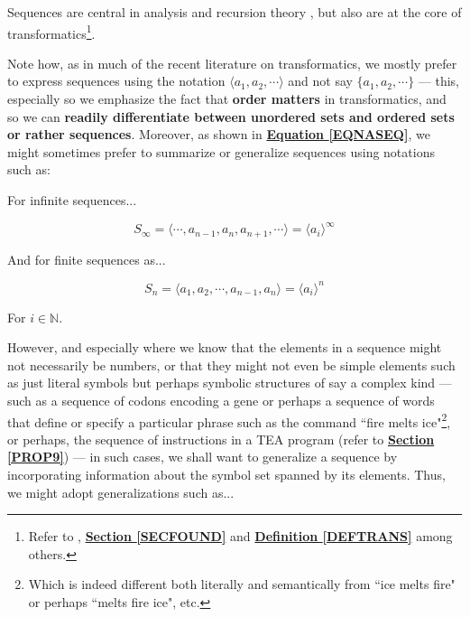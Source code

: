 \documentclass[a4paper, 18pt]{book} %
\begin{document}
\begin{appendices}
 Sequences are central in analysis and recursion theory \cite{rudin1976principles}, but also are at the core of transformatics\footnote{Refer to \cite{Lutalo2025_transformatics_thesis}, \textbf{\hyperref[SECFOUND]{Section \ref{SECFOUND}}} and \textbf{\hyperref[DEFTRANS]{Definition \ref{DEFTRANS}}} among others.}.

\vspace{2em}

Note how, as in much of the recent literature on transformatics, we mostly prefer to express sequences using the notation $\langle a_1, a_2, \cdots \rangle$ and not say $\{ a_1, a_2, \cdots \}$ --- this, especially so we emphasize the fact that \textbf{order matters} in transformatics, and so we can \textbf{readily differentiate between unordered sets and ordered sets or rather sequences}. Moreover, as shown in \textbf{\hyperref[EQNASEQ]{Equation \ref{EQNASEQ}}}, we might sometimes prefer to summarize or generalize sequences using notations such as:

\vspace{2em}
For infinite sequences...

\begin{equation}
S_\infty = \langle \cdots, a_{n-1}, a_n, a_{n+1}, \cdots \rangle = \langle a_i \rangle^\infty
\end{equation} 

\vspace{2em}
And for finite sequences as...

\begin{equation}
S_n = \langle a_1, a_2, \cdots, a_{n-1}, a_n \rangle = \langle a_i \rangle^n
\end{equation} 

\vspace{2em}

For $i \in \mathbb{N}$. 

\vspace{2em}

However, and especially where we know that the elements in a sequence might not necessarily be numbers, or that they might not even be simple elements such as just literal symbols but perhaps symbolic structures of say a complex kind --- such as a sequence of codons encoding a gene or perhaps a sequence of words that define or specify a particular phrase such as the command ``fire melts ice"\footnote{Which is indeed different both literally and semantically from ``ice melts fire" or perhaps ``melts fire ice", etc.}, or perhaps, the sequence of instructions in a TEA program (refer to \textbf{\hyperref[PROP9]{Section \ref{PROP9}}}) --- in such cases, we shall want to generalize a sequence by incorporating information about the symbol set spanned by its elements. Thus, we might  adopt generalizations such as...


\end{appendices}
\end{document}
